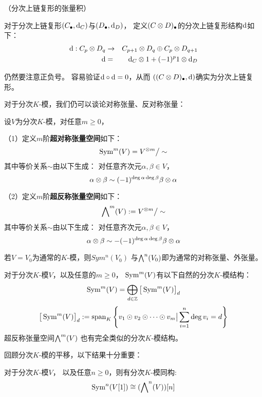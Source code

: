 \begin{definition}（分次上链复形的张量积）

对于分次上链复形$(C_{\bullet},\mathrm{d}_C)$与$(D_{\bullet},\mathrm{d}_D)$，
定义$(C\otimes D)_{\bullet}$的分次上链复形结构$\mathrm{d}$如下：
\begin{eqnarray*}
\mathrm{d}:C_p\otimes D_q &\to& C_{p+1}\otimes D_q\oplus C_p\otimes D_{q+1}\\
\mathrm{d} &=&\mathrm{d}_C\otimes 1+(-1)^p1\otimes \mathrm{d}_D
\end{eqnarray*}
\end{definition}
仍然要注意正负号。
容易验证$\mathrm{d}\circ\mathrm{d}=0$，从而
$((C\otimes D)_{\bullet},\mathrm{d})$确实为分次上链复形。

对于分次$K$-模，我们仍可以谈论对称张量、反对称张量：

\begin{definition}设$V$为分次$K$-模，对任意$m\geq0$，

（1）定义$m$阶\textbf{超对称张量空间}如下：
$$\operatorname{Sym}^m(V)=V^{\otimes m}\big/\sim$$
其中等价关系$\sim$由以下生成：
对任意齐次元$\alpha,\beta\in V$，
$$\alpha\otimes\beta\sim(-1)^{\deg\alpha\deg\beta}\beta\otimes\alpha$$

（2）定义$m$阶\textbf{超反称张量空间}如下：
$$\bigwedge\nolimits^{m}(V):=V^{\otimes m}\big/\sim$$
其中等价关系$\sim$由以下生成：
对任意齐次元$\alpha,\beta\in V$，
$$\alpha\otimes\beta\sim-(-1)^{\deg\alpha\deg\beta}\beta\otimes\alpha$$
\end{definition}

若$V=V_0$为通常的$K$-模，则$Sym^n(V_0)$
与$\bigwedge\nolimits^{n}(V_0)$即为通常的对称张量、外张量。

对于分次$K$-模$V$，以及任意的$m\geq 0$，
$\operatorname{Sym}^m(V)$有以下自然的分次$K$-模结构：
$$\operatorname{Sym}^m(V)=\bigoplus_{d\in\mathbb{Z}}
\big[\operatorname{Sym}^m(V)\big]_d$$
$$\big[\operatorname{Sym}^m(V)\big]_d
:=\operatorname{span}_K\left\{
           v_1\odot v_2\odot\cdots\odot v_m
           \big|\sum\limits_{i=1}^n\deg v_i=d
         \right\}
$$
超反称张量空间$\bigwedge\nolimits^{m}(V)$
也有完全类似的分次$K$-模结构。

回顾分次$K$-模的平移，以下结果十分重要：


\begin{prop}对于分次$K$-模$V$，
以及任意$n\geq0$，则有分次$K$-模同构:
$$\operatorname{Sym}^n(V[1])\cong(\bigwedge\nolimits^{n}(V))[n]$$
\end{prop}

